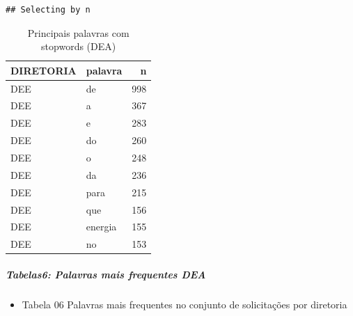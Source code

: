 \documentclass[]{article}
\newenvironment{Shaded}{\begin{snugshade}}{\end{snugshade}}
\newcommand{\KeywordTok}[1]{\textcolor[rgb]{0.13,0.29,0.53}{\textbf{#1}}}
\newcommand{\DataTypeTok}[1]{\textcolor[rgb]{0.13,0.29,0.53}{#1}}
\newcommand{\DecValTok}[1]{\textcolor[rgb]{0.00,0.00,0.81}{#1}}
\newcommand{\StringTok}[1]{\textcolor[rgb]{0.31,0.60,0.02}{#1}}
\newcommand{\OperatorTok}[1]{\textcolor[rgb]{0.81,0.36,0.00}{\textbf{#1}}}
\newcommand{\NormalTok}[1]{#1}
\providecommand{\tightlist}{%
  \setlength{\itemsep}{0pt}\setlength{\parskip}{0pt}}
\let\oldsubparagraph\subparagraph
\renewcommand{\subparagraph}[1]{\oldsubparagraph{#1}\mbox{}}
\begin{document}
\begin{verbatim}
## Selecting by n
\end{verbatim}

\begin{table}[!h]

\caption{\label{tab:unnamed-chunk-26}Principais palavras com stopwords (DEA)}
\centering
\begin{tabular}{llr}
\toprule
DIRETORIA & palavra & n\\
\midrule
\rowcolor{gray!6}  DEE & de & 998\\
DEE & a & 367\\
\rowcolor{gray!6}  DEE & e & 283\\
DEE & do & 260\\
\rowcolor{gray!6}  DEE & o & 248\\
\addlinespace
DEE & da & 236\\
\rowcolor{gray!6}  DEE & para & 215\\
DEE & que & 156\\
\rowcolor{gray!6}  DEE & energia & 155\\
DEE & no & 153\\
\bottomrule
\end{tabular}
\end{table}

\subparagraph{Tabelas6: Palavras mais frequentes
DEA}\label{tabelas6-palavras-mais-frequentes-dea}

\begin{itemize}
\tightlist
\item
  Tabela 06 Palavras mais frequentes no conjunto de solicitações por
  diretoria
\end{itemize}

\begin{Shaded}
\end{Shaded}
\end{document}
